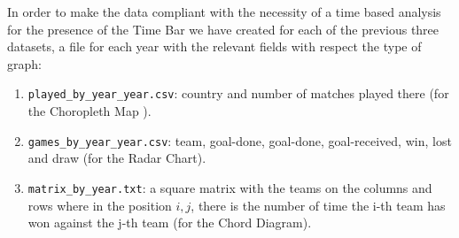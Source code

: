 \documentclass[journal]{vgtc}                %
\begin{document}
In order to make the data compliant with the necessity of a time based analysis for the presence of the Time Bar we have created for each of the previous three datasets, a file for each year with the relevant fields with respect the type of graph:
\begin{enumerate}
\item \texttt{played\_by\_year\_year.csv}: country and number of matches played there (for the Choropleth Map ).
\item \texttt{games\_by\_year\_year.csv}: team, goal-done, goal-done, goal-received, win, lost and draw (for the Radar Chart).
\item \texttt{matrix\_by\_year.txt}: a square matrix with the teams on the columns and rows where in the position $i, j$, there is the number of time the i-th team has won against the j-th team (for the Chord Diagram).
\end{enumerate}
\end{document}
